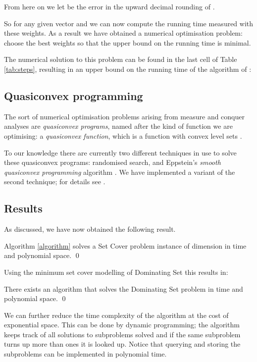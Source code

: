 \documentclass[fleqn]{stacs_proc}
\begin{document}
From here on we let  be the error in the upward decimal rounding of .

So for any given vector  and 
we can now compute the running time measured with these weights.
As a result we have obtained a numerical optimisation problem: choose
the best weights so that the upper bound on the running time is minimal.

The numerical solution to this problem can be found in the last cell of Table \ref{tab:steps},
resulting in an upper bound on the running time of the algorithm of :



\subsection{Quasiconvex programming}
The sort of numerical optimisation problems arising from
measure and conquer analyses are {\em quasiconvex programs}, named after
the kind of function we are optimising: a {\em quasiconvex function},
which is a function with convex level sets .

To our knowledge there are currently two different techniques in use to solve
these quasiconvex programs: randomised search, and  Eppstein's \emph{smooth
quasiconvex programming} algorithm \cite{Eppstein04}.
We have implemented a variant of the second technique; for details see \cite{vanRooij06}.



\subsection{Results}
As discussed, we have now obtained the following result.
\begin{theorem}
Algorithm \ref{algorithm} solves a {\sc Set Cover}
problem instance of dimension  in  time and polynomial space.
\qed
\end{theorem}
Using the minimum set cover modelling of {\sc Dominating Set} this results in:
\begin{corollary}
There exists an algorithm that solves the {\sc Dominating Set} problem in  time and polynomial space.
\qed
\end{corollary}

We can further reduce the time complexity of the algorithm at the cost of exponential space.
This can be done by dynamic programming; the algorithm keeps track of all solutions to
subproblems solved and if the same subproblem turns up more than ones it is looked up.
Notice that querying and storing the subproblems can be implemented in polynomial time.
\end{document}
